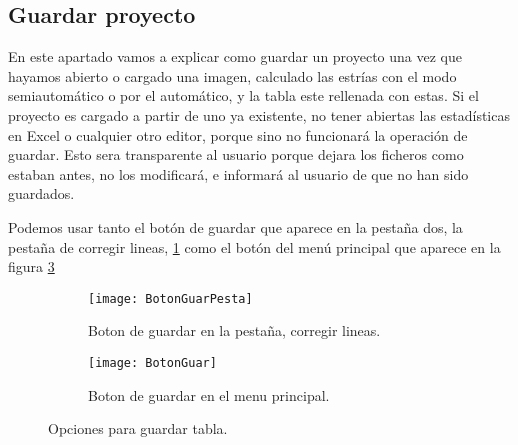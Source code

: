 \subsection{Guardar proyecto}

En este apartado vamos a explicar como guardar un proyecto una vez que hayamos abierto o cargado una imagen, calculado las estrías con el modo semiautomático o por el automático, y la tabla este rellenada con estas. 
Si el proyecto es cargado a partir de uno ya existente, no tener abiertas las estadísticas en Excel o cualquier otro editor, porque sino no funcionará la operación de guardar. Esto sera transparente al usuario porque dejara los ficheros como estaban antes, no los modificará, e informará al usuario de que no han sido guardados. 

Podemos usar tanto el botón de guardar que aparece en la pestaña dos, la pestaña de corregir lineas, \ref{fig:BotonGuarPesta} como el botón del menú principal que aparece en la figura \ref{fig:BotonGuar}

\begin{figure}
	\begin{subfigure}[c]{.5\linewidth}
	\centering\large \texttt{[image: BotonGuarPesta]}
	\caption{Boton de guardar en la pestaña, corregir lineas.}\label{fig:BotonGuarPesta}
	\end{subfigure}%
	\begin{subfigure}[c]{.5\linewidth}
	\centering\large \texttt{[image: BotonGuar]}
	\caption{Boton de guardar en el menu principal.}\label{fig:BotonGuar}
	\end{subfigure}%
	\caption{Opciones para guardar tabla.}
\end{figure}
